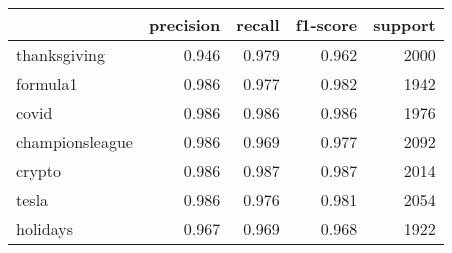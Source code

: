 \begin{tabular}{lrrrr}
\toprule
{} &  precision &  recall &  f1-score &  support \\
\midrule
thanksgiving    &      0.946 &   0.979 &     0.962 &     2000 \\
formula1        &      0.986 &   0.977 &     0.982 &     1942 \\
covid           &      0.986 &   0.986 &     0.986 &     1976 \\
championsleague &      0.986 &   0.969 &     0.977 &     2092 \\
crypto          &      0.986 &   0.987 &     0.987 &     2014 \\
tesla           &      0.986 &   0.976 &     0.981 &     2054 \\
holidays        &      0.967 &   0.969 &     0.968 &     1922 \\
\bottomrule
\end{tabular}
